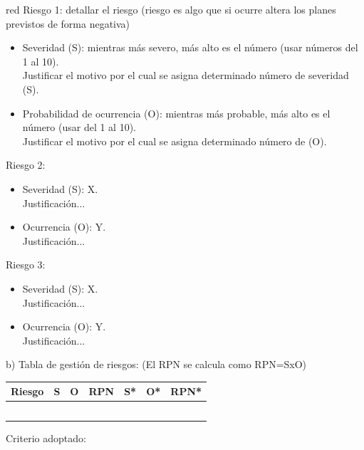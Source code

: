 \documentclass[
11pt, %
]{charter}
\begin{document}
{\begin{consigna}{red}
Riesgo 1: detallar el riesgo (riesgo es algo que si ocurre altera los planes previstos de forma negativa)
\begin{itemize}
	\item Severidad (S): mientras más severo, más alto es el número (usar números del 1 al 10).\\
	Justificar el motivo por el cual se asigna determinado número de severidad (S).
	\item Probabilidad de ocurrencia (O): mientras más probable, más alto es el número (usar del 1 al 10).\\
	Justificar el motivo por el cual se asigna determinado número de (O). 
\end{itemize}   

Riesgo 2:
\begin{itemize}
	\item Severidad (S): X.\\
	Justificación...
	\item Ocurrencia (O): Y.\\
	Justificación...
\end{itemize}

Riesgo 3:
\begin{itemize}
	\item Severidad (S):  X.\\
	Justificación...
	\item Ocurrencia (O): Y.\\
	Justificación...
\end{itemize}


b) Tabla de gestión de riesgos:      (El RPN se calcula como RPN=SxO)

\begin{table}[htpb]
\centering
\begin{tabularx}{\linewidth}{@{}|X|c|c|c|c|c|c|@{}}
\hline
\rowcolor[HTML]{C0C0C0} 
Riesgo & S & O & RPN & S* & O* & RPN* \\ \hline
       &   &   &     &    &    &      \\ \hline
       &   &   &     &    &    &      \\ \hline
       &   &   &     &    &    &      \\ \hline
       &   &   &     &    &    &      \\ \hline
       &   &   &     &    &    &      \\ \hline
\end{tabularx}%
\end{table}

Criterio adoptado: 


\end{consigna}}
\end{document}
